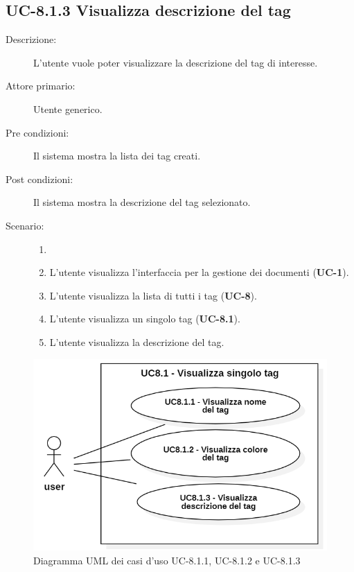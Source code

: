 \subsection{UC-8.1.3 Visualizza descrizione del tag}
\begin{description}
    \item[Descrizione:] L’utente vuole poter visualizzare la descrizione del tag di interesse.
    \item[Attore primario:] Utente generico.
    \item[Pre condizioni:] Il sistema mostra la lista dei tag creati.
    \item[Post condizioni:] Il sistema mostra la descrizione del tag selezionato.
    \item[Scenario:]
    \begin{enumerate}
        \item[] 
        \item L’utente visualizza l'interfaccia per la gestione dei documenti (\textbf{UC-1}).
        \item L’utente visualizza la lista di tutti i tag (\textbf{UC-8}).
        \item L'utente visualizza un singolo tag (\textbf{UC-8.1}).
        \item L'utente visualizza la descrizione del tag.
    \end{enumerate}
\end{description}

\begin{figure}[H]
    \centering
    \includegraphics[width=0.8\linewidth]{UC8.1.1-2-3.PNG}
    \caption{Diagramma UML dei casi d'uso UC-8.1.1, UC-8.1.2 e UC-8.1.3}
    \label{fig:UC8.1.1-2-3}
\end{figure}

